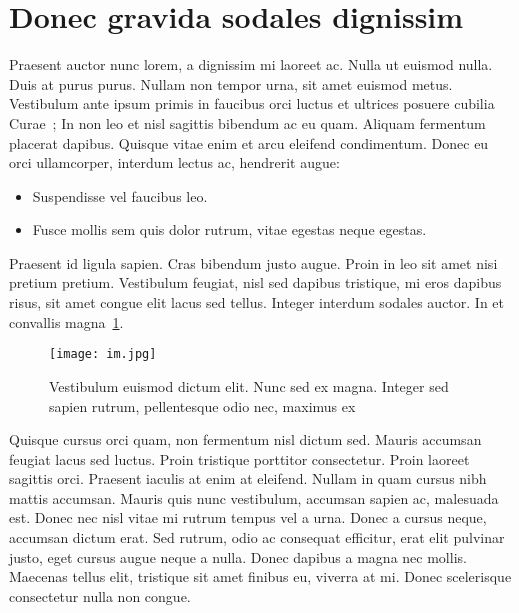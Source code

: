 \section{Donec gravida sodales dignissim}
Praesent auctor nunc lorem, a dignissim mi laoreet ac. Nulla ut euismod nulla. Duis at purus purus. Nullam non tempor urna, sit amet euismod metus. Vestibulum ante ipsum primis in faucibus orci luctus et ultrices posuere cubilia Curae~\cite{Inbook}; In non leo et nisl sagittis bibendum ac eu quam. Aliquam fermentum placerat dapibus. Quisque vitae enim et arcu eleifend condimentum. Donec eu orci ullamcorper, interdum lectus ac, hendrerit augue:
\begin{itemize}\itemsep0pt
    \item Suspendisse vel faucibus leo.
    \item Fusce mollis sem quis dolor rutrum, vitae egestas neque egestas.
\end{itemize}

Praesent id ligula sapien. Cras bibendum justo augue. Proin in leo sit amet nisi pretium pretium. Vestibulum feugiat, nisl sed dapibus tristique, mi eros dapibus risus, sit amet congue elit lacus sed tellus. Integer interdum sodales auctor. In et convallis magna~\ref{fig:my_label}.

\begin{figure}[H]
	\begin{center}
		\texttt{[image: im.jpg]}
		\caption{Vestibulum euismod dictum elit. Nunc sed ex magna. Integer sed sapien rutrum, pellentesque odio nec, maximus ex}
		\label{fig:my_label}
	\end{center}
\end{figure}


Quisque cursus orci quam, non fermentum nisl dictum sed. Mauris accumsan feugiat lacus sed luctus. Proin tristique porttitor consectetur. Proin laoreet sagittis orci. Praesent iaculis at enim at eleifend. Nullam in quam cursus nibh mattis accumsan. Mauris quis nunc vestibulum, accumsan sapien ac, malesuada est. Donec nec nisl vitae mi rutrum tempus vel a urna. Donec a cursus neque, accumsan dictum erat. Sed rutrum, odio ac consequat efficitur, erat elit pulvinar justo, eget cursus augue neque a nulla. Donec dapibus a magna nec mollis. Maecenas tellus elit, tristique sit amet finibus eu, viverra at mi. Donec scelerisque consectetur nulla non congue.


